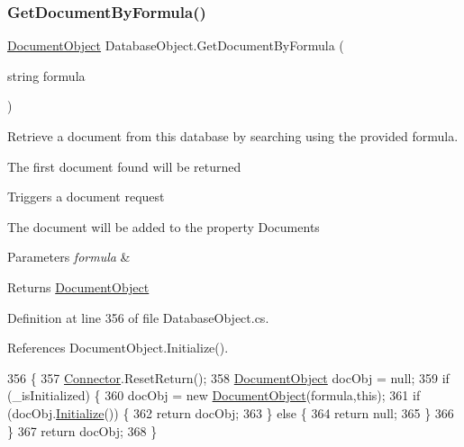 \subsubsection{\texorpdfstring{Get\+Document\+By\+Formula()}{GetDocumentByFormula()}}
{\footnotesize\ttfamily \mbox{\hyperlink{class_document_object}{Document\+Object}} Database\+Object.\+Get\+Document\+By\+Formula (\begin{DoxyParamCaption}\item[{string}]{formula }\end{DoxyParamCaption})}



Retrieve a document from this database by searching using the provided formula. 

The first document found will be returned

Triggers a document request

The document will be added to the property \textquotesingle{}Documents\textquotesingle{}


\begin{DoxyParams}{Parameters}
{\em formula} & \\
\hline
\end{DoxyParams}
\begin{DoxyReturn}{Returns}
\mbox{\hyperlink{class_document_object}{Document\+Object}}
\end{DoxyReturn}


Definition at line 356 of file Database\+Object.\+cs.



References Document\+Object.\+Initialize().


\begin{DoxyCode}
356                                                                \{
357         \mbox{\hyperlink{class_connector}{Connector}}.ResetReturn();
358         \mbox{\hyperlink{class_document_object}{DocumentObject}} docObj = null;
359         \textcolor{keywordflow}{if} (\_isInitialized) \{
360             docObj = \textcolor{keyword}{new} \mbox{\hyperlink{class_document_object}{DocumentObject}}(formula,\textcolor{keyword}{this});
361             \textcolor{keywordflow}{if} (docObj.\mbox{\hyperlink{class_document_object_af4298d6cfbb9ea60643d9995309b73f1}{Initialize}}()) \{
362                 \textcolor{keywordflow}{return} docObj;
363             \} \textcolor{keywordflow}{else} \{
364                 \textcolor{keywordflow}{return} null;
365             \}
366         \}
367         \textcolor{keywordflow}{return} docObj;
368     \}
\end{DoxyCode}
\mbox{\label{class_database_object_a57bfc77d2754236cbcf6ac30a90da529}} 
